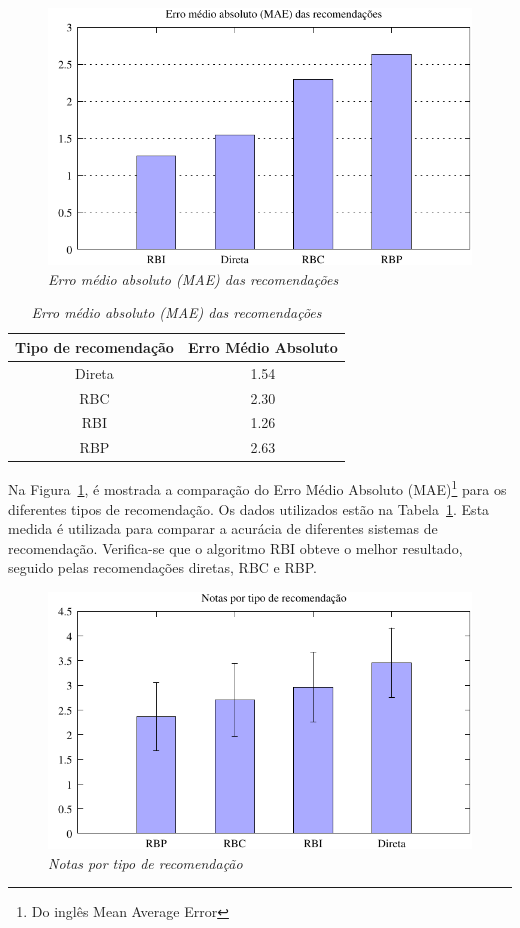 \begin{figure}
    \centering
    \includegraphics[width=\textwidth]{imagens/grafico_erro}
    \caption{\it Erro médio absoluto (MAE) das recomendações}
    \label{fig:erro}
\end{figure}

\begin{table}
\centering
\begin{tabular}{cc}
    \hline
    \hline
    \textbf{Tipo de recomendação} & \textbf{Erro Médio Absoluto} \\
\hline 
Direta & 1.54 \\
\hline 
RBC & 2.30 \\
\hline 
RBI & 1.26 \\
\hline 
RBP & 2.63 \\
\hline        
\end{tabular}
\caption{\it Erro médio absoluto (MAE) das recomendações}
\label{table:erro}
\end{table}

Na Figura~\ref{fig:erro}, é mostrada a comparação do Erro Médio Absoluto (MAE)\footnote{Do inglês Mean Average Error} para os diferentes tipos de recomendação. Os dados utilizados estão na Tabela~\ref{table:erro}. Esta medida é utilizada para comparar a acurácia de diferentes sistemas de recomendação. Verifica-se que o algoritmo RBI obteve o melhor resultado, seguido pelas recomendações diretas, RBC e RBP. 


\begin{figure}
    \centering
    \includegraphics[width=\textwidth]{imagens/grafico_notas_medias}
    \caption{\it Notas por tipo de recomendação}
    \label{fig:notas_medias}
\end{figure}

